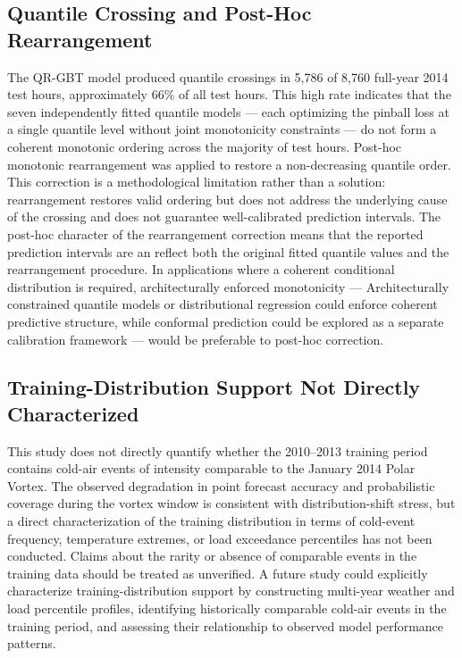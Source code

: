 \documentclass[12pt,a4paper]{article}
\begin{document}
\subsection{Quantile Crossing and Post-Hoc Rearrangement}


The QR-GBT model produced quantile crossings in 5,786 of 8,760 full-year 2014 test hours, approximately 66\% of all test hours. This high rate indicates that the seven independently fitted quantile models --- each optimizing the pinball loss at a single quantile level without joint monotonicity constraints --- do not form a coherent monotonic ordering across the majority of test hours. Post-hoc monotonic rearrangement was applied to restore a non-decreasing quantile order. This correction is a methodological limitation rather than a solution: rearrangement restores valid ordering but does not address the underlying cause of the crossing and does not guarantee well-calibrated prediction intervals.
The post-hoc character of the rearrangement correction means that the reported prediction intervals are an reflect both the original fitted quantile values and the rearrangement procedure. In applications where a coherent conditional distribution is required, architecturally enforced monotonicity --- Architecturally constrained quantile models or distributional regression could enforce coherent predictive structure, while conformal prediction could be explored as a separate calibration framework --- would be preferable to post-hoc correction.
\subsection{Training-Distribution Support Not Directly Characterized}
This study does not directly quantify whether the 2010–2013 training period contains cold-air events of intensity comparable to the January 2014 Polar Vortex. The observed degradation in point forecast accuracy and probabilistic coverage during the vortex window is consistent with distribution-shift stress, but a direct characterization of the training distribution in terms of cold-event frequency, temperature extremes, or load exceedance percentiles has not been conducted. Claims about the rarity or absence of comparable events in the training data should be treated as unverified. A future study could explicitly characterize training-distribution support by constructing multi-year weather and load percentile profiles, identifying historically comparable cold-air events in the training period, and assessing their relationship to observed model performance patterns.
\end{document}
